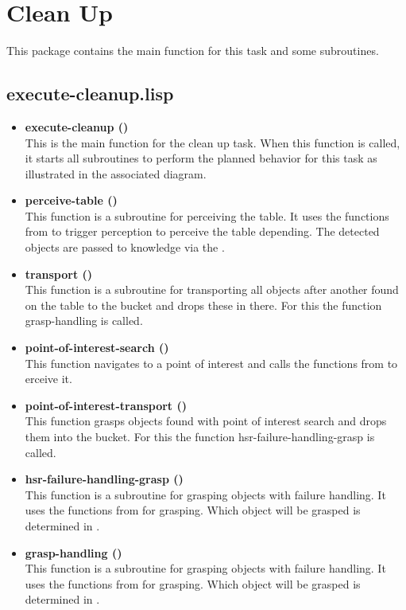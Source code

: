 \documentclass[main.tex]{subfiles}
\begin{document}
	  	\section{Clean Up}
	  	\label{clean}
	  	This package contains the main function for this task and some subroutines.
	  	\subsection{execute-cleanup.lisp}
	  	\begin{itemize}
			\item \textbf{execute-cleanup ()} \\
			This is the main function for the clean up task. When this function is called, it starts all subroutines to perform the planned behavior for this task as illustrated in the associated diagram.
			\item \textbf{perceive-table ()} \\
			This function is a subroutine for perceiving the table. It uses the functions from  to trigger perception to perceive the table depending. The detected objects are passed to knowledge via the .
			\item \textbf{transport ()} \\
            This function is a subroutine for transporting all objects after another found on the table to the bucket and drops these in there. For this the function grasp-handling is called.
			\item \textbf{point-of-interest-search ()} \\
			This function navigates to a point of interest and calls the functions from  to erceive it. 
			\item \textbf{point-of-interest-transport ()} \\
			This function grasps objects found with point of interest search and drops them into the bucket. For this the function hsr-failure-handling-grasp is called.
			\item \textbf{hsr-failure-handling-grasp ()} \\
			This function is a subroutine for grasping objects with failure handling. It uses the functions from  for grasping. Which object will be grasped is determined in .
			\item \textbf{grasp-handling ()}\\
			This function is a subroutine for grasping objects with failure handling. It uses the functions from  for grasping. Which object will be grasped is determined in .
		\end{itemize}
\end{document}
